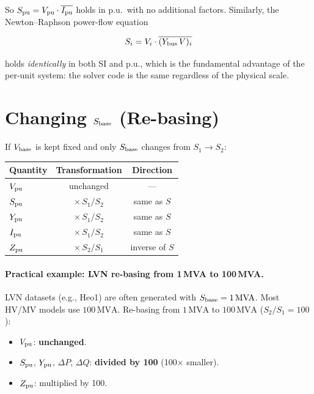 \documentclass{article}
\begin{document}
So $S_{\rm pu} = V_{\rm pu} \cdot \overline{I_{\rm pu}}$ holds in p.u.\ with
no additional factors.  Similarly, the Newton--Raphson power-flow equation

\begin{equation}
  S_i = V_i \cdot \overline{(Y_{\rm bus}\, V)_i}
\end{equation}

holds \emph{identically} in both SI and p.u., which is the fundamental
advantage of the per-unit system: the solver code is the same regardless of
the physical scale.

\section{Changing $S_{\rm base}$ (Re-basing)}

If $V_{\rm base}$ is kept fixed and only $S_{\rm base}$ changes from
$S_1 \to S_2$:

\begin{center}
\begin{tabular}{lcc}
\toprule
Quantity & Transformation & Direction \\
\midrule
$V_{\rm pu}$   & unchanged              & — \\
$S_{\rm pu}$   & $\times\, S_1/S_2$    & same as $S$ \\
$Y_{\rm pu}$   & $\times\, S_1/S_2$    & same as $S$ \\
$I_{\rm pu}$   & $\times\, S_1/S_2$    & same as $S$ \\
$Z_{\rm pu}$   & $\times\, S_2/S_1$    & inverse of $S$ \\
\bottomrule
\end{tabular}
\end{center}

\paragraph{Practical example: LVN re-basing from 1\,MVA to 100\,MVA.}
LVN datasets (e.g., Heo1) are often generated with $S_{\rm base} =
1\,\mathrm{MVA}$.  Most HV/MV models use $100\,\mathrm{MVA}$.  Re-basing
from $1\,\mathrm{MVA}$ to $100\,\mathrm{MVA}$ ($S_2 / S_1 = 100$):

\begin{itemize}[noitemsep]
  \item $V_{\rm pu}$: \textbf{unchanged}.
  \item $S_{\rm pu}$, $Y_{\rm pu}$, $\Delta P$, $\Delta Q$:
    \textbf{divided by 100} (100$\times$ smaller).
  \item $Z_{\rm pu}$: multiplied by 100.
\end{itemize}
\end{document}
